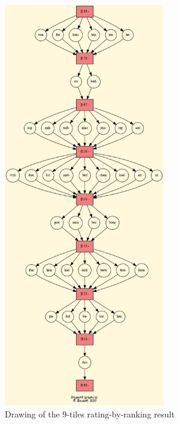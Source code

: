 \begin{figure}[h]
\includegraphics[width=7cm]{Figures/ratingResult.png}
\caption{Drawing of the 9-tiles rating-by-ranking result}
\label{fig:14.5}       %
\end{figure}


